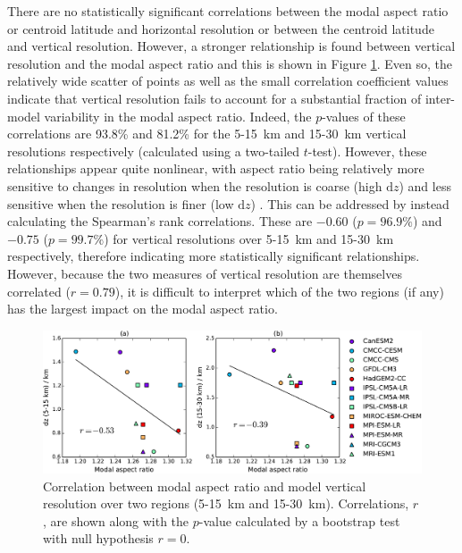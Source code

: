 There are no statistically significant correlations between the modal aspect
ratio or centroid latitude and horizontal resolution or between the centroid
latitude and vertical resolution. However, a stronger relationship is found
between vertical resolution and the modal aspect ratio and this is shown in
Figure \ref{fig:aspect_vert_res}. Even so, the relatively wide scatter of points
as well as the small correlation coefficient values indicate that vertical
resolution fails to account for a substantial fraction of inter-model
variability in the modal aspect ratio. Indeed, the $p$-values of these
correlations are 93.8\% and 81.2\% for the 5-15~km and 15-30~km vertical
resolutions respectively (calculated using a two-tailed $t$-test). However,
these relationships appear quite nonlinear, with aspect ratio being relatively
more sensitive to changes in resolution when the resolution is coarse (high
$\mathrm{d}z$) and less sensitive when the resolution is finer (low
$\mathrm{d}z$) . This can be addressed by instead calculating the Spearman's
rank correlations. These are $-0.60$ ($p=96.9\%$) and $-0.75$ ($p=99.7\%$) for
vertical resolutions over 5-15~km and 15-30~km respectively, therefore
indicating more statistically significant relationships. However, because the
two measures of vertical resolution are themselves correlated ($r=0.79$), it is
difficult to interpret which of the two regions (if any) has the largest impact
on the modal aspect ratio.

\begin{figure}
 \centering
 \noindent\includegraphics[width=\textwidth]{figures/chapter-models/aspect_ratio_resolution.pdf}
 \caption[Vertical resolution and modal aspect ratio.]{Correlation between modal aspect ratio and
   model vertical resolution over two regions (5-15~km and
   15-30~km). Correlations, $r$, are shown along with the $p$-value calculated by a
   bootstrap test with null hypothesis $r=0$.}
 \label{fig:aspect_vert_res}
\end{figure}

